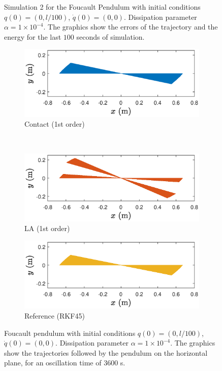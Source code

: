 \documentclass{aims}
\numberwithin{equation}{section}
\theoremstyle{definition}
\begin{document}
\begin{figure}
\begin{subfigure}[b]{0.65\textwidth}
  \end{subfigure}
  \caption{Simulation 2 for the Foucault Pendulum with initial conditions $q(0) = (0,l/100)$, $\dot{q}(0) = (0,0)$. Dissipation parameter $\alpha = 1\times 10^{-4}$. The graphics show the errors of the trajectory and the energy for the last $100$ seconds of simulation. }
  \label{fig:foucault_sim_2_err_energy}
\end{figure}

\begin{figure}
  \centering
  \begin{subfigure}[b]{0.65\textwidth}
    \centering
    \includegraphics[width=\textwidth]{fig/contacto-alpha00001.eps}
    \caption{Contact (1st order)}
  \end{subfigure} \\
  \begin{subfigure}[b]{0.65\textwidth}
    \centering
    \includegraphics[width=\textwidth]{fig/ld-alpha00001.eps}
    \caption{LA (1st order)}
  \end{subfigure}
  \begin{subfigure}[b]{0.65\textwidth}
    \centering
    \includegraphics[width=\textwidth]{fig/ref-alpha00001.eps}
    \caption{Reference (RKF45)}
  \end{subfigure}
  \caption{Foucault pendulum with initial conditions  $q(0) = (0,l/100)$, $\dot{q}(0) = (0,0)$. Dissipation parameter $\alpha = 1 \times 10^{-4}$. The graphics show the trajectories followed by the pendulum on the horizontal plane, for an oscillation time of 3600 s.}
  \label{fig:foucault_sim_2_oscillation_plane}
\end{figure}
\end{document}
